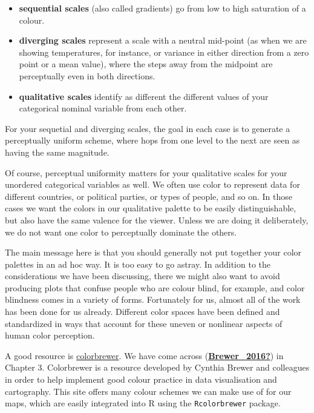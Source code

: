 \documentclass[
]{book}
\providecommand{\tightlist}{%
  \setlength{\itemsep}{0pt}\setlength{\parskip}{0pt}}
\begin{document}
\begin{itemize}
\tightlist
\item
  \textbf{sequential scales} (also called gradients) go from low to high saturation of a colour.
\item
  \textbf{diverging scales} represent a scale with a neutral mid-point (as when we are showing temperatures, for instance, or variance in either direction from a zero point or a mean value), where the steps away from the midpoint are perceptually even in both directions.
\item
  \textbf{qualitative scales} identify as different the different values of your categorical nominal variable from each other.
\end{itemize}

For your sequetial and diverging scales, the goal in each case is to generate a perceptually uniform scheme, where hops from one level to the next are seen as having the same magnitude.

Of course, perceptual uniformity matters for your qualitative scales for your unordered categorical variables as well. We often use color to represent data for different countries, or political parties, or types of people, and so on. In those cases we want the colors in our qualitative palette to be easily distinguishable, but also have the same valence for the viewer. Unless we are doing it deliberately, we do not want one color to perceptually dominate the others.

The main message here is that you should generally not put together your color palettes in an ad hoc way. It is too easy to go astray. In addition to the considerations we have been discussing, there we might also want to avoid producing plots that confuse people who are colour blind, for example, and color blindness comes in a variety of forms. Fortunately for us, almost all of the work has been done for us already. Different color spaces have been defined and standardized in ways that account for these uneven or nonlinear aspects of human color perception.

A good resource is \href{http://colorbrewer2.org/}{colorbrewer}. We have come across (\protect\hyperlink{ref-Brewer_2016}{\textbf{Brewer\_2016?}}) in Chapter 3. Colorbrewer is a resource developed by Cynthia Brewer and colleagues in order to help implement good colour practice in data visualisation and cartography. This site offers many colour schemes we can make use of for our maps, which are easily integrated into R using the \texttt{Rcolorbrewer} package.
\end{document}
